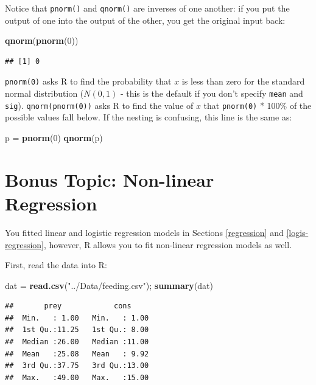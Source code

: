 \documentclass[]{book}
\newenvironment{Shaded}{\begin{snugshade}}{\end{snugshade}}
\newcommand{\KeywordTok}[1]{\textcolor[rgb]{0.13,0.29,0.53}{\textbf{#1}}}
\newcommand{\DecValTok}[1]{\textcolor[rgb]{0.00,0.00,0.81}{#1}}
\newcommand{\StringTok}[1]{\textcolor[rgb]{0.31,0.60,0.02}{#1}}
\newcommand{\NormalTok}[1]{#1}
\theoremstyle{definition}
\theoremstyle{definition}
\theoremstyle{definition}
\theoremstyle{remark}
\begin{document}
Notice that \texttt{pnorm()} and \texttt{qnorm()} are inverses of one
another: if you put the output of one into the output of the other, you
get the original input back:

\begin{Shaded}
\begin{Highlighting}[]
\KeywordTok{qnorm}\NormalTok{(}\KeywordTok{pnorm}\NormalTok{(}\DecValTok{0}\NormalTok{))}
\end{Highlighting}
\end{Shaded}

\begin{verbatim}
## [1] 0
\end{verbatim}

\texttt{pnorm(0)} asks R to find the probability that \(x\) is less than
zero for the standard normal distribution (\(N(0,1)\) - this is the
default if you don't specify \texttt{mean} and \texttt{sig}).
\texttt{qnorm(pnorm(0))} asks R to find the value of \(x\) that
\texttt{pnorm(0)} * 100\% of the possible values fall below. If the
nesting is confusing, this line is the same as:

\begin{Shaded}
\begin{Highlighting}[]
\NormalTok{p =}\StringTok{ }\KeywordTok{pnorm}\NormalTok{(}\DecValTok{0}\NormalTok{)}
\KeywordTok{qnorm}\NormalTok{(p)}
\end{Highlighting}
\end{Shaded}

\section{Bonus Topic: Non-linear Regression}\label{nls}

You fitted linear and logistic regression models in Sections
\ref{regression} and \ref{logis-regression}, however, R allows you to
fit non-linear regression models as well.

First, read the data into R:

\begin{Shaded}
\begin{Highlighting}[]
\NormalTok{dat =}\StringTok{ }\KeywordTok{read.csv}\NormalTok{(}\StringTok{"../Data/feeding.csv"}\NormalTok{); }\KeywordTok{summary}\NormalTok{(dat)}
\end{Highlighting}
\end{Shaded}

\begin{verbatim}
##       prey            cons      
##  Min.   : 1.00   Min.   : 1.00  
##  1st Qu.:11.25   1st Qu.: 8.00  
##  Median :26.00   Median :11.00  
##  Mean   :25.08   Mean   : 9.92  
##  3rd Qu.:37.75   3rd Qu.:13.00  
##  Max.   :49.00   Max.   :15.00
\end{verbatim}
\end{document}
